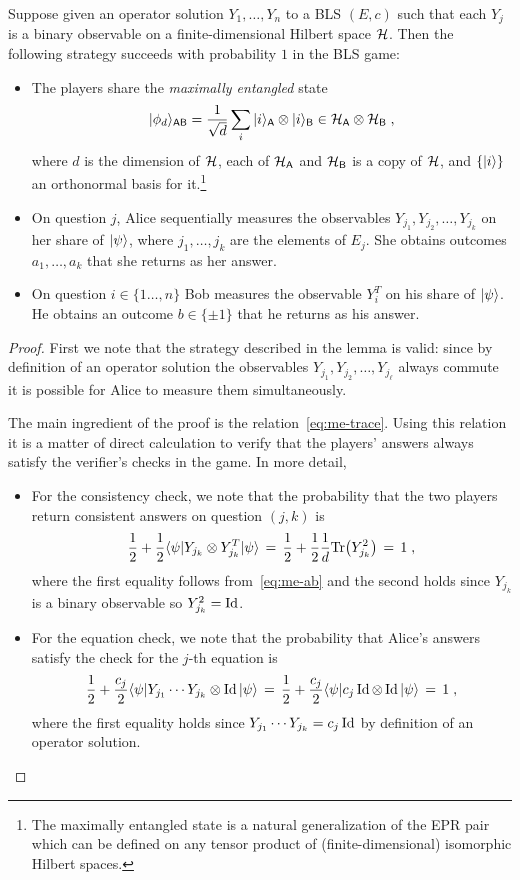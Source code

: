 \begin{lemma}\label{lem:bcs-perfect}
Suppose given an operator solution $Y_1,\ldots,Y_n$ to a BLS $(E,c)$ such that each $Y_j$ is a binary observable on a finite-dimensional Hilbert space $\mathcal{H}$. Then the following strategy succeeds with probability $1$ in the BLS game:
\begin{itemize}
\item The players share the \emph{maximally entangled} state 
\begin{equation}\label{eq:psi-bls}
 |\phi_d\rangle_{{\textsf{AB}}} = \frac{1}{\sqrt{d}} \sum_{i} |i\rangle_{{\textsf{A}}} \otimes |i\rangle_{{\textsf{B}}} \in \mathcal{H}_{\textsf{A}} \otimes \mathcal{H}_{\textsf{B}}\;,
\end{equation}
 where $d$ is the dimension of $\mathcal{H}$, each of $\mathcal{H}_{\textsf{A}}$ and $\mathcal{H}_{\textsf{B}}$ is a copy of $\mathcal{H}$, and $\{|i\rangle\}$ an orthonormal basis for it.\footnote{The maximally entangled state is a natural generalization of the EPR pair which can be defined on any tensor product of (finite-dimensional) isomorphic Hilbert spaces.}
\item On question $j$, Alice sequentially measures the observables $Y_{j_1},Y_{j_2},\ldots,Y_{j_k}$ on her share of $|\psi\rangle$, where $j_1,\ldots,j_k$ are the elements of $E_j$. She obtains outcomes $a_1,\ldots,a_k$ that she returns as her answer. 
\item On question $i\in \{1\ldots,n\}$ Bob measures the observable $Y_{i}^T$ on his share of $|\psi\rangle$. He obtains an outcome $b\in\{\pm 1\}$ that he returns as his answer. 
\end{itemize}
\end{lemma}

\begin{proof}
First we note that the strategy described in the lemma is valid: since by definition of an operator solution the observables $Y_{j_1},Y_{j_2},\ldots,Y_{j_\ell}$ always commute it is possible for Alice to measure them simultaneously. 

The main ingredient of the proof is the relation~\eqref{eq:me-trace}.  Using this relation it is a matter of direct calculation to verify that the players' answers always satisfy the verifier's checks in the game. In more detail, 
\begin{itemize}
\item For the consistency check, we note that the probability that the two players return consistent answers on question $(j,k)$ is 
\[ \frac{1}{2}+\frac{1}{2}\langle\psi| Y_{j_k} \otimes Y_{j_k}^T |\psi\rangle \,=\, \frac{1}{2}+\frac{1}{2}\frac{1}{d} \mbox{\rm Tr}\big(Y_{j_k}^2\big) \,=\, 1\;,\]
where the first equality follows from~\eqref{eq:me-ab} and the second holds since $Y_{j_k}$ is a binary observable so $Y_{j_k}^2 = \mathop{\rm Id}\nolimits$. 
\item For the equation check, we note that the probability that Alice's answers satisfy the check for the $j$-th equation is 
\[ \frac{1}{2}+\frac{c_j}{2}\langle\psi|  Y_{j_1}\cdots Y_{j_k}\otimes \mathop{\rm Id}\nolimits |\psi\rangle \,=\,\frac{1}{2}+\frac{c_j}{2} \langle\psi| c_j\mathop{\rm Id}\nolimits\otimes \mathop{\rm Id}\nolimits  |\psi\rangle\,=\,1\;,\]
where the first equality holds since $Y_{j_1}\cdots Y_{j_k} =c_j\mathop{\rm Id}\nolimits$ by definition of an operator solution.
\end{itemize}
\end{proof}

